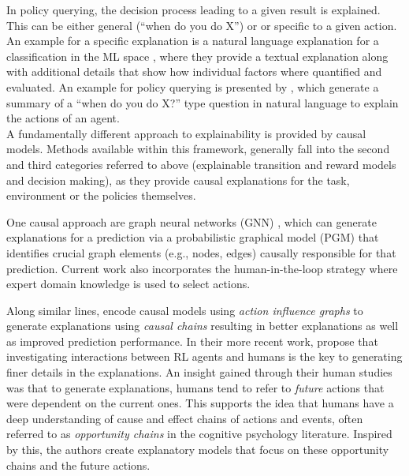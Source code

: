\documentclass[twoside,11pt]{article}
\begin{document}

In policy querying, the decision process leading to a given result is explained. This can be either general (``when do you do X'') or or specific to a given action.
An example for a specific explanation is a natural language explanation for a classification in the ML space \citep{AlonsoEtAl:2018:xAINLBeerClassifier}, where they provide a textual explanation along with additional details that show how individual factors where quantified and evaluated. An example for policy querying is presented by \citet{HayesShah:2017:AutonomousPolicyExplanation}, which generate a summary of a ``when do you do X?'' type question in natural language to explain the actions of an agent. \\


A fundamentally different approach to explainability is provided by causal models. Methods available within this framework, generally fall into the second and third categories referred to above (explainable transition and reward models and decision making), as they provide causal explanations for the task, environment or the policies themselves. 

One causal approach are graph neural networks (GNN) \citep{Vu:2020:PGMExplainer}, which can generate explanations for a prediction via a probabilistic graphical model (PGM) that identifies crucial graph elements (e.g., nodes, edges) causally responsible for that prediction. Current work also incorporates the human-in-the-loop strategy \citep{HolzingerEtAl:2016:iMLExperiment, Holzinger:2019:HumanLoopAPIN} where expert domain knowledge is used to select actions. 

Along similar lines, \citet{MadumalEtAl:2020:CausalRLCFs} encode causal models using \emph{action influence graphs} to generate explanations using \emph{causal chains} resulting in better explanations as well as improved prediction performance. In their more recent work, \citet{Madumal:2020:DistalEF} propose that investigating interactions between RL agents and humans is the key to generating finer details in the explanations. An insight gained through their human studies was that to generate explanations, humans tend to refer to \emph{future} actions that were dependent on the current ones. This supports the idea that humans have a deep understanding of cause and effect chains of actions and events, often referred to as \emph{opportunity chains} in the cognitive psychology literature. Inspired by this, the authors create explanatory models that focus on these opportunity chains and the future actions.
\end{document}
